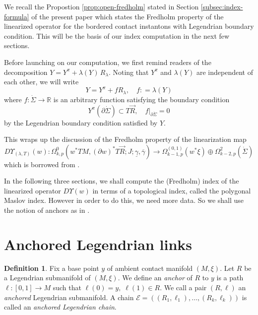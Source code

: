 \documentclass[reqno]{amsart}
\def\R{\ifmmode{\mathbb R}\else{$\mathbb R$}\fi} %
\newcommand{\del}{\partial}
\newcommand{\be}{\begin{equation}}
\newcommand{\ee}{\end{equation}}
\theoremstyle{theorem}
\theoremstyle{definition}
\newtheorem{defn}[thm]{Definition}
\numberwithin{equation}{section}
\def\R{{\mathbb R}}
\def\R{{\mathbb R}}
\def\R{\ifmmode{\mathbb R}\else{$\mathbb R$}\fi} %
\def\R{{\mathbb R}}
\def\R{{\mathbb R}}
\begin{document}
We  recall the Propostion \ref{prop:open-fredholm}
stated in Section \ref{subsec:index-formula} of the present paper
which states the Fredholm property of the linearized operator
for the bordered contact instantons with Legendrian boundary condition.
This will be the basis of our index computation in the next few sections.

Before launching on our computation,  we first
remind readers of the decomposition $Y = Y^\pi + \lambda(Y)\, R_\lambda$.
Noting that $Y^\pi$ and $\lambda(Y)$ are independent of each other, we will write
\be\label{eq:Y-decompose}
Y = Y^\pi + f R_\lambda, \quad f: = \lambda(Y)
\ee
where $f: \dot \Sigma \to \R$ is an arbitrary function satisfying the boundary condition
\be\label{eq:Y-bdy-condition}
Y^\pi(\del \dot \Sigma) \subset T\vec R, \quad f|_{\del \dot \Sigma} = 0
\ee
by the Legendrian boundary condition satisfied by $Y$.

This wraps up the discussion of the Fredholm property of
the linearization map
$$
D\Upsilon_{(\lambda,T)}(w): \Omega^0_{k,p}(w^*TM, (\del w)^*T\vec R;J;\underline \gamma,\overline \gamma) \to
\Omega^{(0,1)}_{k-1,p}(w^*\xi) \oplus \Omega^2_{k-2,p}(\dot \Sigma)
$$
which is borrowed from \cite{oh:contacton-transversality}.

In the following three sections, we shall compute the (Fredholm) index of the linearized operator $D\Upsilon(w)$ in terms of a topological index, called the polygonal Maslov
index. However in order to do this, we need more data. So we shall use the notion of
anchors as in \cite{fooo:anchored}.

\section{Anchored Legendrian links}
\label{sec:anchored}

\begin{defn}
Fix a base point $y$ of ambient contact manifold $(M,\xi)$. Let $R$ be a Legendrian submanifold of $(M,\xi)$. We define an
\emph{anchor} of $R$ to $y$ is a path $\ell:[0,1] \rightarrow M$ such that $\ell(0)=y,\;\ell(1)\in R$. We call a pair $(R,\ell)$ an \emph{anchored} Legendrian submanifold.
A chain $\mathcal{E} = ((R_1,\ell_1),\ldots,(R_k,\ell_k))$ is called an \emph{anchored Legendrian chain}.
\end{defn}
\end{document}
